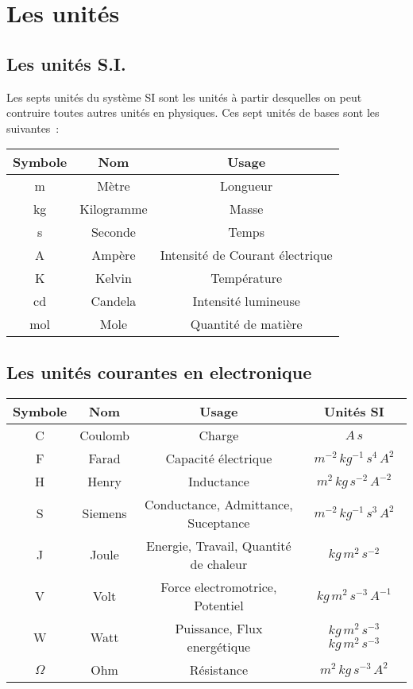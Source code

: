 \chapter{Les unités}

\section{Les unités S.I.}

Les septs unités du système SI sont les unités à partir desquelles on peut contruire toutes autres unités en physiques. Ces sept unités de bases sont les suivantes~:

\begin{center}
\bgroup
\def\arraystretch{1.2}%
\begin{tabular}{|c c c|}
	\hline
	\textbf{Symbole} & \textbf{Nom} & \textbf{Usage} \\
	\hline
	\hline
	m & Mètre & Longueur \\
	kg & Kilogramme & Masse \\
	s & Seconde & Temps \\
	A & Ampère & Intensité de Courant électrique \\
	K & Kelvin & Température \\
	cd & Candela & Intensité lumineuse \\
	mol & Mole & Quantité de matière \\
	\hline
\end{tabular}
\egroup
\end{center}

\section{Les unités courantes en electronique}
\begin{center}
\bgroup
\def\arraystretch{1.2}%
\begin{tabular}{|c c c c|}
	\hline
	\textbf{Symbole} & \textbf{Nom} & \textbf{Usage} & \textbf{Unités SI}  \\
	\hline
	\hline
	C & Coulomb & Charge & $A\,s$ \\
	F & Farad & Capacité électrique & $m^{-2}\,kg^{-1}\,s^{4}\,A^{2}$ \\
	H & Henry & Inductance & $m^2\,kg\,s^{-2}\,A^{-2}$ \\
	S & Siemens & Conductance, Admittance, Suceptance & $m^{-2}\,kg^{-1}\,s^{3}\,A^{2}$ \\
	J & Joule & Energie, Travail, Quantité de chaleur & $kg\,m^2\,s^{-2}$  \\
	V & Volt & Force electromotrice, Potentiel & $kg\,m^{2}\,s^{-3}\,A^{-1}$  \\
	W & Watt & Puissance, Flux energétique & $kg\,m^2\,s^{-3}$$kg\,m^2\,s^{-3}$ \\
	$\Omega$ & Ohm & Résistance & $m^2\,kg\,s^{-3}\,A^2$ \\
	\hline
\end{tabular}
\egroup
\end{center}

